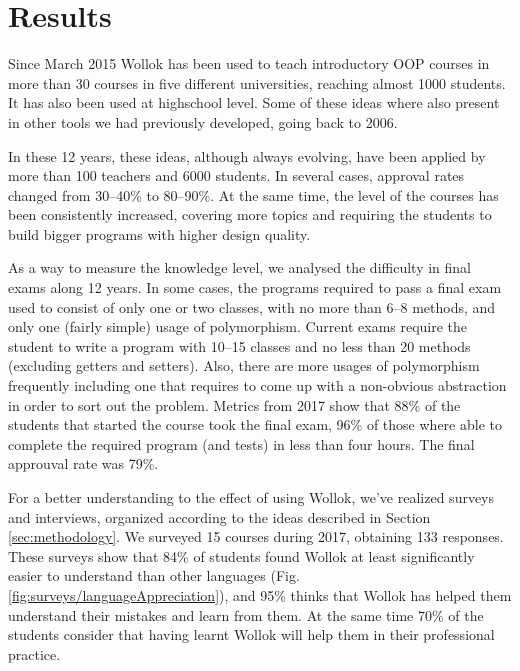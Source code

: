 \section{Results}
\label{sec:results}
Since March 2015 Wollok has been used to teach introductory OOP courses 
in more than 30 courses in five different universities, reaching almost 1000 students.
It has also been used at highschool level.
Some of these ideas where also present in other tools we had previously developed, going back to 2006. 

In these 12 years, these ideas, although always evolving, have been applied by more than 100 teachers and 6000 students. 
In several cases, approval rates changed from 30--40\% to 80--90\%.
At the same time, the level of the courses has been consistently increased, 
covering more topics and requiring the students to build bigger programs with higher design quality.


As a way to measure the knowledge level, we analysed the difficulty in final exams along 12 years.
In some cases, the programs required to pass a final exam used to consist of only one or two classes, 
with no more than 6--8 methods, and only one (fairly simple) usage of polymorphism.
Current exams require the student to write a program with 10--15 classes and no less than 20 methods (excluding getters and setters).
Also, there are more usages of polymorphism 
frequently including one that requires to come up with a non-obvious abstraction in order to sort out the problem.
Metrics from 2017 show that 88\% of the students that started the course took the final exam,
96\% of those where able to complete the required program (and tests) in less than four hours.
The final approuval rate was 79\%.

\medskip

For a better understanding to the effect of using Wollok, we've realized surveys and interviews, organized according to the ideas described in Section \ref{sec:methodology}.
We surveyed 15 courses during 2017, obtaining 133 responses.
These surveys show that 84\% of students found Wollok at least significantly easier to understand than other languages (\cf Fig. \ref{fig:surveys/languageAppreciation}),
and 95\% thinks that Wollok has helped them understand their mistakes and learn from them.
At the same time 70\% of the students consider that having learnt Wollok will help them in their professional practice.

